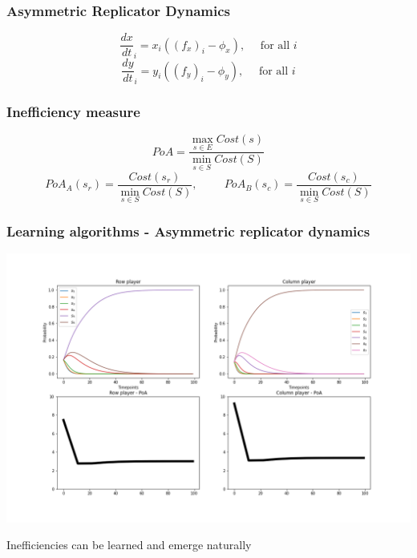 \begin{frame}
    \frametitle{Asymmetric Replicator Dynamics}
    \centering

    \[
        \frac{dx}{dt}_i = x_i((f_x)_i - \phi_x), \quad \text{ for all }i
    \]
    \[
        \frac{dy}{dt}_i = y_i((f_y)_i - \phi_y), \quad \text{ for all }i
    \]
    
\end{frame}


\begin{frame}
    \frametitle{Inefficiency measure}

    \begin{equation*}
        PoA = \frac{\max_{s \in E} Cost(s)}{\min_{s \in S} Cost(S)}
    \end{equation*}
    \pause
    \footnotesize
    \vspace{1cm}
    \begin{equation*}
        PoA_A(s_r) = \frac{Cost(s_r)}{\min_{s \in S} Cost(S)}, \hspace{1cm} 
        PoA_B(s_c) = \frac{Cost(s_c)}{\min_{s \in S} Cost(S)}
    \end{equation*}
\end{frame}


\begin{frame}
    \frametitle{Learning algorithms - Asymmetric replicator dynamics}

    \includegraphics[scale=0.28]{Bin/ARD_game.png}
\end{frame}

\begin{frame}
    \centering
    \Huge{
    Inefficiencies can be learned and emerge naturally
    }
\end{frame}


